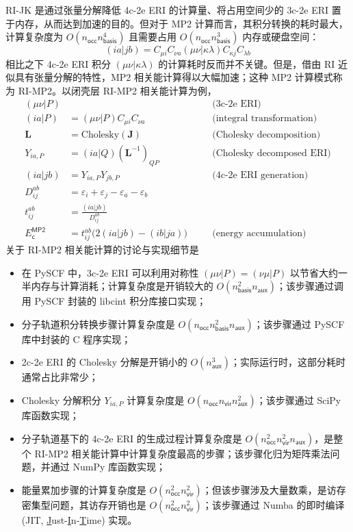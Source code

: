 RI-JK 是通过张量分解降低 4c-2e ERI 的计算量、将占用空间少的 3c-2e ERI 置于内存，从而达到加速的目的。但对于 MP2 计算而言，其积分转换的耗时最大，计算复杂度为 $O(n_\textsf{occ} n_\textsf{basis}^4)$ 且需要占用 $O(n_\textsf{occ} n_\textsf{basis}^3)$ 内存或硬盘空间：
\begin{equation}
  (ia|jb) = C_{\mu i} C_{\nu a} (\mu \nu | \kappa \lambda) C_{\kappa j} C_{\lambda b}
\end{equation}
相比之下 4c-2e ERI 积分 $(\mu \nu | \kappa \lambda)$ 的计算耗时反而并不关键。但是，借由 RI 近似具有张量分解的特性，MP2 相关能计算得以大幅加速；这种 MP2 计算模式称为 RI-MP2\cite{Feyereisen-Komornicki.CPL.1993, 10.1016/S0009-2614(98)00862-8}。以闭壳层 RI-MP2 相关能计算为例，
\begin{subequations}
\begin{alignat}{10}
  (\mu \nu | P) & && \quad \text{(3c-2e ERI)} \\
  (ia|P) &= (\mu \nu | P) C_{\mu i} C_{\nu a} && \quad \text{(integral transformation)} \\
  \mathbf{L} &= \mathrm{Cholesky} (\mathbf{J}) && \quad \text{(Cholesky decomposition)} \\
  Y_{ia, P} &= (ia|Q) (\mathbf{L}^{-1})_{QP} && \quad \text{(Cholesky decomposed ERI)} \\
  (ia|jb) &= Y_{ia, P} Y_{jb, P} && \quad \text{(4c-2e ERI generation)} \\
  D_{ij}^{ab} &= \varepsilon_i + \varepsilon_j - \varepsilon_a - \varepsilon_b \\
  t_{ij}^{ab} &= \frac{(ia|jb)}{D_{ij}^{ab}} \\
  E_\textsf{c}^\textsf{MP2} &= t_{ij}^{ab} \big(2 (ia|jb) - (ib|ja) \big) && \quad \text{(energy accumulation)}
\end{alignat}
\end{subequations}
关于 RI-MP2 相关能计算的讨论与实现细节是
\begin{itemize}[nosep]
  \item 在 PySCF 中，3c-2e ERI 可以利用对称性 $(\mu \nu | P) = (\nu \mu | P)$ 以节省大约一半内存与计算消耗；计算复杂度是开销较大的 $O(n_\textsf{basis}^2 n_\textsf{aux})$；该步骤通过调用 PySCF 封装的 libcint 积分库接口实现；
  \item 分子轨道积分转换步骤计算复杂度是 $O(n_\textsf{occ} n_\textsf{basis}^2 n_\textsf{aux})$；该步骤通过 PySCF 库中封装的 C 程序实现；
  \item 2c-2e ERI 的 Cholesky 分解是开销小的 $O(n_\textsf{aux}^3)$；实际运行时，这部分耗时通常占比非常少；
  \item Cholesky 分解积分 $Y_{ia, P}$ 计算复杂度是 $O(n_\textsf{occ} n_\textsf{vir} n_\textsf{aux}^2)$；该步骤通过 SciPy 库函数实现；
  \item 分子轨道基下的 4c-2e ERI 的生成过程计算复杂度是 $O(n_\textsf{occ}^2 n_\textsf{vir}^2 n_\textsf{aux})$，是整个 RI-MP2 相关能计算中计算复杂度最高的步骤；该步骤化归为矩阵乘法问题，并通过 NumPy 库函数实现；
  \item 能量累加步骤的计算复杂度是 $O(n_\textsf{occ}^2 n_\textsf{vir}^2)$；但该步骤涉及大量数乘，是访存密集型问题，其访存开销也是 $O(n_\textsf{occ}^2 n_\textsf{vir}^2)$；该步骤通过 Numba 的即时编译 (JIT, \underline{J}ust-\underline{I}n-\underline{T}ime) 实现。
\end{itemize}
